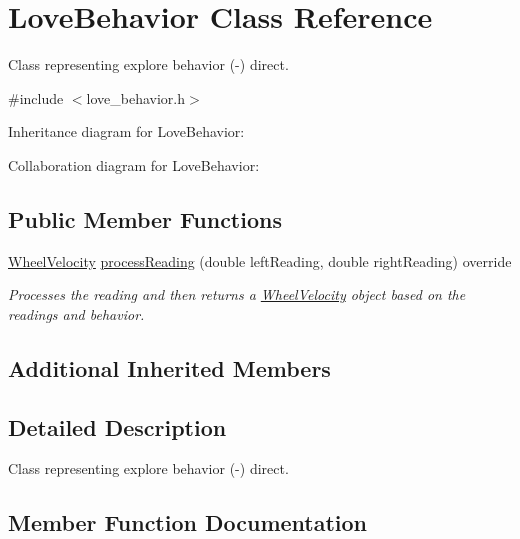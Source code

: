 \hypertarget{classLoveBehavior}{}\section{Love\+Behavior Class Reference}
\label{classLoveBehavior}


Class representing explore behavior (-\/) direct.  




{\ttfamily \#include $<$love\+\_\+behavior.\+h$>$}



Inheritance diagram for Love\+Behavior\+:


Collaboration diagram for Love\+Behavior\+:
\subsection*{Public Member Functions}
\begin{DoxyCompactItemize}
\item 
\hyperlink{structWheelVelocity}{Wheel\+Velocity} \hyperlink{classLoveBehavior_adcbb382efb0d3e58c9a883b4234f7225}{process\+Reading} (double left\+Reading, double right\+Reading) override
\begin{DoxyCompactList}\small\item\em Processes the reading and then returns a \hyperlink{structWheelVelocity}{Wheel\+Velocity} object based on the readings and behavior. \end{DoxyCompactList}\end{DoxyCompactItemize}
\subsection*{Additional Inherited Members}


\subsection{Detailed Description}
Class representing explore behavior (-\/) direct. 

\subsection{Member Function Documentation}

